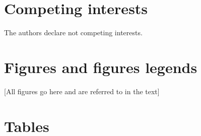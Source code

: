 \documentclass[english]{article}
\begin{document}
\section*{Competing interests}


The authors declare not competing interests.

\section*{Figures and figures legends}



[All figures go here and are referred to in the text]

\section*{Tables}

\end{document}
